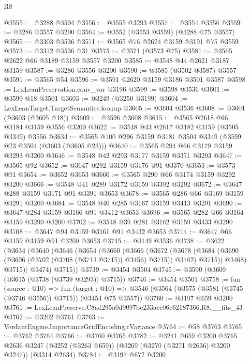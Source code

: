 \begin{lexlean}{R8}
\begin{coremodule}
@3555 := @3288 @3504
@3556 := @3555 @3293
@3557 := @3554 @3556
@3559 := @3286 @3557 @3200
@3564 := @3552 (@3553 @3559) (@3288 @75 @3557)
@3565 := @3303 @3536
@3571 := @3565 @76 @2624 @3159 @3191 @75 @3559
@3573 := @3312 @3536 @31
@3575 := @3571 (@3573 @75)
@3581 := @3565 @2622 @66 @3189 @3159 @3557 @3200
@3585 := @3548 @44 @2621 @3187 @3159
@3587 := @3286 @3556 @3200
@3590 := @3585 (@3502 @3587) @3557
@3591 := @3565 @54
@3596 := @3591 @2620 @3159 @3186 @3501 @3587
@3598 := LexLeanPreservation.conv_var @3196
@3599 := @3598 @3536
@3601 := @3599 @18 @3501
@3603 := @3249 (@3250 @3199)
@3604 := LexLeanTarget.TargetSemantics.lookup
@3605 := @3604 @3536
@3608 := @3601 (@3603 (@3605 @18))
@3609 := @3596 @3608
@3615 := @3565 @2618 @66 @3184 @3159 @3556 @3200
@3622 := @3548 @43 @2617 @3182 @3159 (@3505 @3349) @3556
@3634 := @3565 @100 @296 @3159 @3181 @3504 @3349 (@3599 @23 @3504 (@3603 (@3605 @23)))
@3640 := @3565 @294 @66 @3179 @3159 @3293 @3200
@3646 := @3548 @42 @293 @3177 @3159 @3371 @3293
@3647 := @3565 @92
@3652 := @3647 @292 @3159 @3176 @91 @3370
@3653 := @3573 @91
@3654 := @3652 @3653
@3660 := @3565 @290 @66 @3174 @3159 @3292 @3200
@3666 := @3548 @41 @289 @3172 @3159 @3392 @3292
@3672 := @3647 @288 @3159 @3171 @91 @3391 @3653
@3678 := @3565 @286 @66 @3169 @3159 @3291 @3200
@3684 := @3548 @40 @285 @3167 @3159 @3413 @3291
@3690 := @3647 @284 @3159 @3166 @91 @3412 @3653
@3696 := @3565 @282 @66 @3164 @3159 @3290 @3200
@3702 := @3548 @39 @281 @3162 @3159 @3433 @3290
@3708 := @3647 @94 @3159 @3161 @91 @3432 @3653
@3714 := @3647 @66 @3159 @3159 @91 @3200 @3653
@3715 := @3449 @3536
@3738 := @3622
    (@3634
      (@3640
        (@3646
          (@3654
            (@3660
              (@3666
                (@3672
                  (@3678
                    (@3684 (@3690 (@3696 (@3702 (@3708 (@3714 @3715)) @3456) @3715)) @3462)
                    @3715))
                @3468)
              @3715))
          @3474)
        @3715))
@3739 := @3454 @3504
@3745 := @3590 (@3609 (@3615 (@3738 (@3739 @3293)) @3715))
@3746 := @3454 @3501
@3758 := fun (source : @10) =>
  fun (target : @10) => @3546 (@3564 (@3575 (@3581 (@3745 (@3746 @3556)) @3715)) (@3454 @75 @3557))
@3760 := @3197 @659 @3200
@3761 := LexLeanPreserve.C8ad295a0d9097be233aee06c62187366.R8.__fits_43
@3762 := @3202 @3761
@3763 := VerdantEngine.ImportanceGridEncoding.rVariance
@3764 := @58 @3763
@3765 := @3762 @3764
@3766 := @3760 @3765
@3782 := @3241
    @659
    @3200
    @3765
    @2636
    @3247
    (@3252 (@3263 @659))
    (@3269 (@3270 (@3271 @2636) @3200 @3247))
    (@3314 @2634)
@3784 := @3197 @672 @3200

\end{coremodule}
\end{lexlean}

